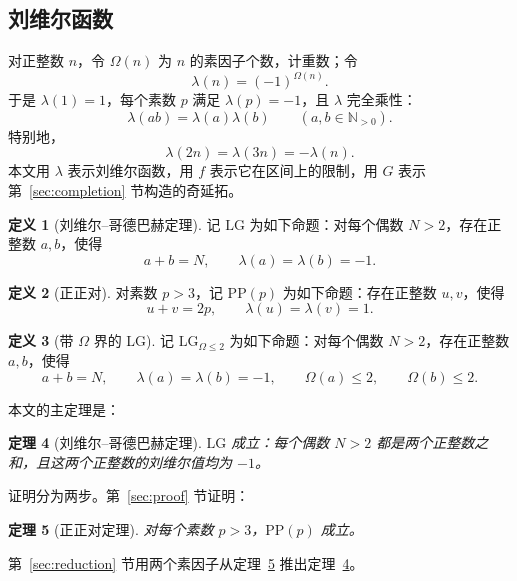 \documentclass[11pt,a4paper]{ctexart}
\theoremstyle{plain}
\newtheorem{theorem}{定理}[section]
\theoremstyle{definition}
\newtheorem{definition}[theorem]{定义}
\newcommand{\N}{\mathbb{N}}
\newcommand{\li}{\lambda}
\newcommand{\Om}{\Omega}
\newcommand{\LG}{\mathrm{LG}}
\newcommand{\LGtwo}{\mathrm{LG}_{\Om\le2}}
\newcommand{\PP}{\mathrm{PP}}
\begin{document}
\subsection{刘维尔函数}
\label{sec:liouville}

对正整数 $n$，令 $\Om(n)$ 为 $n$ 的素因子个数，计重数；令
\begin{equation}
  \li(n)=(-1)^{\Om(n)}.
  \label{eq:liouville}
\end{equation}
于是 $\li(1)=1$，每个素数 $p$ 满足 $\li(p)=-1$，且 $\li$ 完全乘性：
\begin{equation}
  \li(ab)=\li(a)\li(b)\qquad(a,b\in\N_{>0}).
  \label{eq:multiplicative}
\end{equation}
特别地，
\begin{equation}
  \li(2n)=\li(3n)=-\li(n).
  \label{eq:two-three}
\end{equation}
本文用 $\li$ 表示刘维尔函数，用 $f$ 表示它在区间上的限制，用 $G$ 表示第~\ref{sec:completion} 节构造的奇延拓。

\begin{definition}[刘维尔--哥德巴赫定理]
\label{def:LG}
记 $\LG$ 为如下命题：对每个偶数 $N>2$，存在正整数 $a,b$，使得
\[
  a+b=N,\qquad \li(a)=\li(b)=-1.
\]
\end{definition}

\begin{definition}[正正对]
\label{def:PP}
对素数 $p>3$，记 $\PP(p)$ 为如下命题：存在正整数 $u,v$，使得
\[
  u+v=2p,\qquad \li(u)=\li(v)=1.
\]
\end{definition}

\begin{definition}[带 $\Om$ 界的 LG]
\label{def:LGtwo}
记 $\LGtwo$ 为如下命题：对每个偶数 $N>2$，存在正整数 $a,b$，使得
\[
  a+b=N,\qquad \li(a)=\li(b)=-1,\qquad \Om(a)\le2,\qquad \Om(b)\le2.
\]
\end{definition}

本文的主定理是：

\begin{theorem}[刘维尔--哥德巴赫定理]
\label{thm:LG}
$\LG$ 成立：每个偶数 $N>2$ 都是两个正整数之和，且这两个正整数的刘维尔值均为 $-1$。
\end{theorem}

证明分为两步。第~\ref{sec:proof} 节证明：

\begin{theorem}[正正对定理]
\label{thm:PP}
对每个素数 $p>3$，$\PP(p)$ 成立。
\end{theorem}

第~\ref{sec:reduction} 节用两个素因子从定理~\ref{thm:PP} 推出定理~\ref{thm:LG}。
\end{document}

